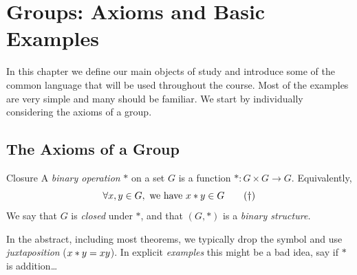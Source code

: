 \graphicspath{{2groups/asy/}}

\section{Groups: Axioms and Basic Examples}\label{chap:groups}


In this chapter we define our main objects of study and introduce some of the common language that will be used throughout the course. Most of the examples are very simple and many should be familiar. We start by individually considering the axioms of a group.

\subsection{The Axioms of a Group}\label{sec:groupaxioms}

\begin{defn}{Closure}{}
A \emph{binary operation} $*$ on a set $G$ is a function $*:G\times G\to G$. Equivalently,
\[
	\forall x,y\in G,\text{ we have }x\mathbin{\ast} y\in G\tag{$\dag$}
\]
We say that $G$ is \emph{closed} under $*$, and that $(G,*)$ is a \emph{binary structure.}
\end{defn}


In the abstract, including most theorems, we typically drop the symbol and use \emph{juxtaposition} ($x\mathbin{\ast} y=xy$). In explicit \emph{examples} this might be a bad idea, say if $*$ is addition\ldots

